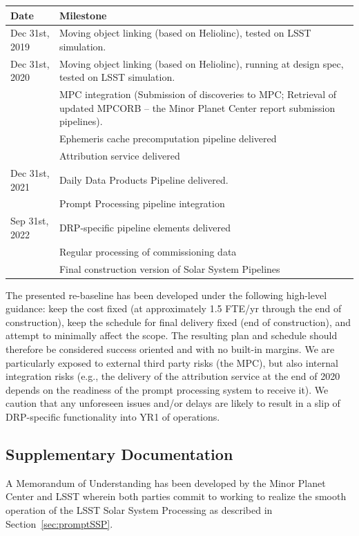 \documentclass[DM,authoryear,toc,lsstdraft]{lsstdoc}
\begin{document}
	\begin{tabular}{ p{1.5in}p{4.5in} } 
		\hline
		Date & Milestone \\
		\hline
		\hline
		Dec 31st, 2019 & Moving object linking (based on Heliolinc), tested on LSST simulation. \\ 
		Dec 31st, 2020 & Moving object linking (based on Heliolinc), running at design spec, tested on LSST simulation. \\ 
			       & MPC integration (Submission of discoveries to MPC; Retrieval of updated MPCORB -- the Minor Planet Center report submission pipelines). \\
		               & Ephemeris cache precomputation pipeline delivered \\
		               & Attribution service delivered \\
		Dec 31st, 2021 & Daily Data Products Pipeline delivered. \\
		               & Prompt Processing pipeline integration \\
		Sep 31st, 2022 & DRP-specific pipeline elements delivered \\
		               & Regular processing of commissioning data \\
		               & Final construction version of Solar System Pipelines \\
		\hline
	\end{tabular}

The presented re-baseline has been developed under the following high-level guidance: keep the cost fixed (at approximately 1.5 FTE/yr through the end of construction), keep the schedule for final delivery fixed (end of construction), and attempt to minimally affect the scope. The resulting plan and schedule should therefore be considered success oriented and with no built-in margins. We are particularly exposed to external third party risks (the MPC), but also internal integration risks (e.g., the delivery of the attribution service at the end of 2020 depends on the readiness of the prompt processing system to receive it). We caution that any unforeseen issues and/or delays are likely to result in a slip of DRP-specific functionality into YR1 of operations.

\subsection{Supplementary Documentation}

A Memorandum of Understanding has been developed by the Minor Planet Center and LSST wherein both parties commit to working to realize the smooth operation of the LSST Solar System Processing as described in Section~\ref{sec:promptSSP}.


\end{document}
